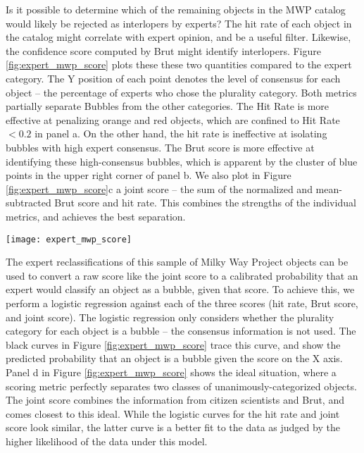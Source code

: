 \documentclass[preprint]{aastex}
\begin{document}
Is it possible to determine which of the remaining objects in the MWP catalog would likely be rejected as interlopers by experts? The hit rate of each object in the catalog might correlate with expert opinion, and be a useful filter. Likewise, the confidence score computed by Brut might identify interlopers. Figure \ref{fig:expert_mwp_score} plots these these two quantities compared to the expert category. The Y position of each point denotes the level of consensus for each object -- the percentage of experts who chose the plurality category. Both metrics partially separate Bubbles from the other categories. The Hit Rate is more effective at penalizing orange and red objects, which are confined to Hit Rate $<0.2$ in panel a. On the other hand, the hit rate is ineffective at isolating bubbles with high expert consensus. The Brut score is more effective at identifying these high-consensus bubbles, which is apparent by the cluster of blue points in the upper right corner of panel b. We also plot in Figure \ref{fig:expert_mwp_score}c a joint score -- the sum of the normalized and mean-subtracted Brut score and hit rate.  This combines the strengths of the individual metrics, and achieves the best separation.

\begin{figure*}
\texttt{[image: expert\_mwp\_score]}
\caption{The ability for the MWP hit rate and Brut score to predict expert expert classifications for objects in the MWP catalog. Each circle represents an object in the MWP catalog. Color depicts the most popular classification, and the y-position indicates the fraction of experts who chose this category. The
black lines estimate the bubble probability (right Y axis), obtained via logistic regression to the object category. The Joint metric, which combines the Hit Rate and Brut score, is best able to predict expert classifications.}
\label{fig:expert_mwp_score}
\end{figure*}

The expert reclassifications of this sample of Milky Way Project objects can be used to convert a raw score like the joint score to a calibrated probability that an expert would classify an object as a bubble, given that score. To achieve this, we perform a logistic regression against each of the three scores (hit rate, Brut score, and joint score). The logistic regression only considers whether the plurality category for each object is a bubble -- the consensus information is not used. The black curves in Figure \ref{fig:expert_mwp_score} trace this curve, and show the predicted probability that an object is a bubble given the score on the X axis. Panel d in Figure \ref{fig:expert_mwp_score} shows the ideal situation, where a scoring metric perfectly separates two classes of unanimously-categorized objects. The joint score combines the information from citizen scientists and Brut, and comes closest to this ideal. While the logistic curves for the hit rate and joint score look similar, the latter curve is a better fit to the data as judged by the higher likelihood of the data under this model.
\end{document}
